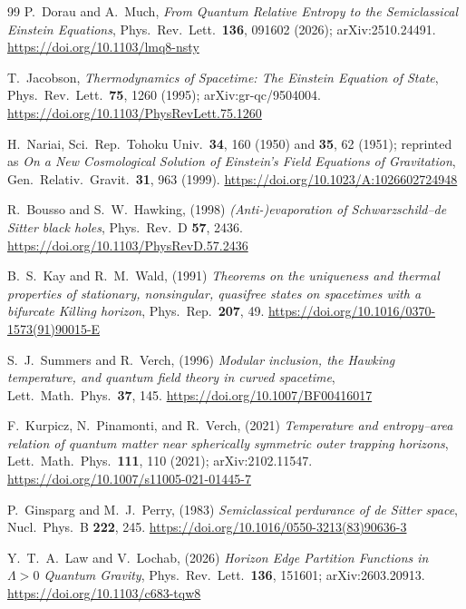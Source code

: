 \documentclass[11pt]{article}
\begin{document}
\begingroup
\footnotesize
\begin{thebibliography}{99}\setlength{\itemsep}{1pt}\setlength{\parskip}{0pt}
 P.~Dorau and A.~Much, \emph{From Quantum Relative Entropy to the Semiclassical Einstein Equations}, Phys.\ Rev.\ Lett.\ \textbf{136}, 091602 (2026); arXiv:2510.24491.
\url{https://doi.org/10.1103/lmq8-nsty}

 T.~Jacobson, \emph{Thermodynamics of Spacetime: The Einstein Equation of State}, Phys.\ Rev.\ Lett.\ \textbf{75}, 1260 (1995); arXiv:gr-qc/9504004. \url{https://doi.org/10.1103/PhysRevLett.75.1260}

 H.~Nariai, Sci.\ Rep.\ Tohoku Univ.\ \textbf{34}, 160 (1950) and \textbf{35}, 62 (1951); reprinted as \emph{On a New Cosmological Solution of Einstein's Field Equations of Gravitation}, Gen.\ Relativ.\ Gravit.\ \textbf{31}, 963 (1999). \url{https://doi.org/10.1023/A:1026602724948}

 R.~Bousso and S.~W.~Hawking, (1998) \emph{(Anti-)evaporation of Schwarzschild--de Sitter black holes}, Phys.\ Rev.\ D \textbf{57}, 2436.
\url{https://doi.org/10.1103/PhysRevD.57.2436}

 B.~S.~Kay and R.~M.~Wald, (1991) \emph{Theorems on the uniqueness and thermal properties of stationary, nonsingular, quasifree states on spacetimes with a bifurcate Killing horizon}, Phys.\ Rep.\ \textbf{207}, 49.
\url{https://doi.org/10.1016/0370-1573(91)90015-E}

 S.~J.~Summers and R.~Verch, (1996) \emph{Modular inclusion, the Hawking temperature, and quantum field theory in curved spacetime}, Lett.\ Math.\ Phys.\ \textbf{37}, 145.
\url{https://doi.org/10.1007/BF00416017}

 F.~Kurpicz, N.~Pinamonti, and R.~Verch, (2021) \emph{Temperature and entropy--area relation of quantum matter near spherically symmetric outer trapping horizons}, Lett.\ Math.\ Phys.\ \textbf{111}, 110 (2021); arXiv:2102.11547. \url{https://doi.org/10.1007/s11005-021-01445-7}

 P.~Ginsparg and M.~J.~Perry, (1983) \emph{Semiclassical perdurance of de Sitter space}, Nucl.\ Phys.\ B \textbf{222}, 245.
\url{https://doi.org/10.1016/0550-3213(83)90636-3}

 Y.~T.~A.~Law and V.~Lochab, (2026) \emph{Horizon Edge Partition Functions in $\Lambda>0$ Quantum Gravity}, Phys.\ Rev.\ Lett.\ \textbf{136}, 151601; arXiv:2603.20913.
\url{https://doi.org/10.1103/c683-tqw8}


\end{thebibliography}
\end{document}
